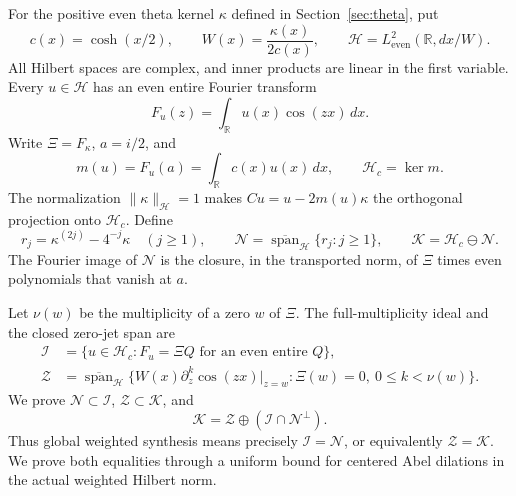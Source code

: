 \documentclass[11pt,a4paper]{article}
\numberwithin{equation}{section}
\theoremstyle{definition}
\theoremstyle{remark}
\newcommand{\R}{\mathbb R}
\newcommand{\Hh}{\mathcal H}
\newcommand{\Nn}{\mathcal N}
\newcommand{\Ii}{\mathcal I}
\newcommand{\Zz}{\mathcal Z}
\newcommand{\Kk}{\mathcal K}
\newcommand{\norm}[1]{\lVert #1\rVert}
\newcommand{\cl}{\overline{\operatorname{span}}}
\begin{document}
For the positive even theta kernel $\kappa$ defined in Section~\ref{sec:theta}, put
\begin{equation}\label{eq:basic-space}
 c(x)=\cosh(x/2),\qquad W(x)=\frac{\kappa(x)}{2c(x)},\qquad
 \Hh=L^2_{\mathrm{even}}(\R,dx/W).
\end{equation}
All Hilbert spaces are complex, and inner products are linear in the first variable. Every $u\in\Hh$ has an even entire Fourier transform
\begin{equation}\label{eq:Fourier-intro}
 F_u(z)=\int_\R u(x)\cos(zx)\,dx.
\end{equation}
Write $\Xi=F_\kappa$, $a=i/2$, and
\begin{equation}\label{eq:center-intro}
 m(u)=F_u(a)=\int_\R c(x)u(x)\,dx,\qquad \Hh_c=\ker m.
\end{equation}
The normalization $\norm{\kappa}_{\Hh}=1$ makes
$Cu=u-2m(u)\kappa$ the orthogonal projection onto $\Hh_c$. Define
\begin{equation}\label{eq:N-intro}
 r_j=\kappa^{(2j)}-4^{-j}\kappa\quad(j\ge1),\qquad
 \Nn=\cl_{\Hh}\{r_j:j\ge1\},\qquad
 \Kk=\Hh_c\ominus\Nn.
\end{equation}
The Fourier image of $\Nn$ is the closure, in the transported norm, of
$\Xi$ times even polynomials that vanish at $a$.

Let $\nu(w)$ be the multiplicity of a zero $w$ of $\Xi$. The full-multiplicity ideal and the closed zero-jet span are
\begin{align}
 \Ii&=\{u\in\Hh_c:F_u=\Xi Q\text{ for an even entire }Q\},\label{eq:I-intro}\\
 \Zz&=\cl_{\Hh}\{W(x)\partial_z^k\cos(zx)|_{z=w}:\Xi(w)=0,\ 0\le k<\nu(w)\}.
 \label{eq:Z-intro}
\end{align}
We prove $\Nn\subset\Ii$, $\Zz\subset\Kk$, and
\begin{equation}\label{eq:main-defect}
 \Kk=\Zz\oplus(\Ii\cap\Nn^\perp).
\end{equation}
Thus global weighted synthesis means precisely $\Ii=\Nn$, or equivalently $\Zz=\Kk$. We prove both equalities through a uniform bound for centered Abel dilations in the actual weighted Hilbert norm.
\end{document}
